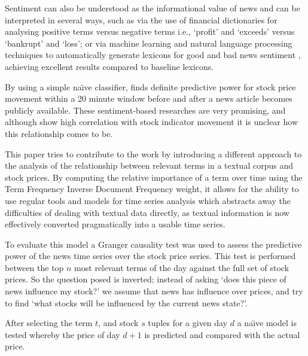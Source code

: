 \documentclass{article}
\begin{document}
\par
Sentiment can also be understood as the informational value of news and can be interpreted in several ways, such as via the use of financial dictionaries for analysing positive terms versus negative terms 
i.e., `profit' and `exceeds' versus `bankrupt' and `loss'; or via machine learning and natural language processing techniques to automatically generate lexicons for good and bad news sentiment \citep{Oliveira2014}, achieving excellent results compared to baseline lexicons.

\par
By using a simple na\"{\i}ve classifier, \citep{gidofalvi2001} finds definite predictive power for stock price movement within a 20 minute window before and after a news article becomes publicly available. These sentiment-based researches are very promising, and although show high correlation with stock indicator movement it is unclear how this relationship comes to be.

\par
This paper tries to contribute to the work by introducing a different approach to the analysis of the relationship between relevant terms in a textual corpus and stock prices. By computing the relative importance of a term over time using the Term Frequency Inverse Document Frequency \citep{Ramos2003} weight, it allows for the ability to use regular tools and models for time series analysis which abstracts away the difficulties of dealing with textual data directly, as textual information is now effectively converted pragmatically into a usable time series.

\par
To evaluate this model a Granger causality test \citep{Granger1969,Granger1980} was used to assess the predictive power of the news time series over the stock price series. This test is performed between the top \(n\) most relevant terms of the day against the full set of stock prices. So the question posed is inverted; instead of asking `does this piece of news influence my stock?' we assume that news has influence over prices, and try to find `what stocks will be influenced by the current news state?'.

\par
After selecting the term \(t\), and stock \(s\) tuples for a given day \(d\) a na\"{\i}ve model is tested whereby the price of day \(d+1\) is predicted and compared with the actual price.
\end{document}
